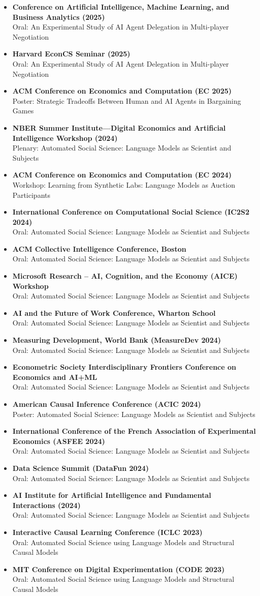 \documentclass[10pt]{article}
\DeclareRobustCommand{\$}{\char36\relax}  %
\newenvironment{rSection}[1]{%
  \par\addvspace{10pt}%
  \begin{list}{}{%
    \setlength{\leftmargin}{1.4in}\setlength{\labelwidth}{1.3in}%
    \setlength{\labelsep}{0.1in}\setlength{\itemsep}{0pt}%
    \setlength{\topsep}{0pt}\setlength{\parsep}{7pt}%
    \renewcommand{\makelabel}[1]{\smash{\parbox[t]{\labelwidth}{\raggedright\scshape ##1}}}}%
  \item[#1]}{\end{list}}
\newcommand{\talk}[2]{\item \textbf{#1}\\\hspace*{1.5em}#2}
\begin{document}
\begin{rSection}{Talks\textsuperscript{2}}
%
\begin{itemize}[label=$\bullet$,before=\raggedright,leftmargin=1em,itemsep=2pt,topsep=0pt]
\talk{Conference on Artificial Intelligence, Machine Learning, and Business Analytics (2025)}{Oral: An Experimental Study of AI Agent Delegation in Multi-player Negotiation}
\talk{Harvard EconCS Seminar (2025)}{Oral: An Experimental Study of AI Agent Delegation in Multi-player Negotiation}
\talk{ACM Conference on Economics and Computation (EC 2025)}{Poster: Strategic Tradeoffs Between Human and AI Agents in Bargaining Games}
\talk{NBER Summer Institute---Digital Economics and Artificial Intelligence Workshop (2024)}{Plenary: Automated Social Science: Language Models as Scientist and Subjects}
\talk{ACM Conference on Economics and Computation (EC 2024)}{Workshop: Learning from Synthetic Labs: Language Models as Auction Participants}
\talk{International Conference on Computational Social Science (IC2S2 2024)}{Oral: Automated Social Science: Language Models as Scientist and Subjects}
\talk{ACM Collective Intelligence Conference, Boston}{Oral: Automated Social Science: Language Models as Scientist and Subjects}
\talk{Microsoft Research -- AI, Cognition, and the Economy (AICE) Workshop}{Oral: Automated Social Science: Language Models as Scientist and Subjects}
\talk{AI and the Future of Work Conference, Wharton School}{Oral: Automated Social Science: Language Models as Scientist and Subjects}
\talk{Measuring Development, World Bank (MeasureDev 2024)}{Oral: Automated Social Science: Language Models as Scientist and Subjects}
\talk{Econometric Society Interdisciplinary Frontiers Conference on Economics and AI+ML}{Oral: Automated Social Science: Language Models as Scientist and Subjects}
\talk{American Causal Inference Conference (ACIC 2024)}{Poster: Automated Social Science: Language Models as Scientist and Subjects}
\talk{International Conference of the French Association of Experimental Economics (ASFEE 2024)}{Oral: Automated Social Science: Language Models as Scientist and Subjects}
\talk{Data Science Summit (DataFun 2024)}{Oral: Automated Social Science: Language Models as Scientist and Subjects}
\talk{AI Institute for Artificial Intelligence and Fundamental Interactions (2024)}{Oral: Automated Social Science: Language Models as Scientist and Subjects}
\talk{Interactive Causal Learning Conference (ICLC 2023)}{Oral: Automated Social Science using Language Models and Structural Causal Models}
\talk{MIT Conference on Digital Experimentation (CODE 2023)}{Oral: Automated Social Science using Language Models and Structural Causal Models}
\end{itemize}
\end{rSection}
\end{document}
